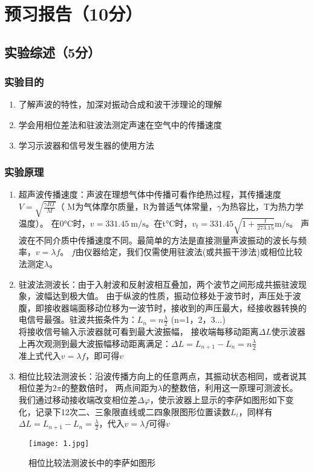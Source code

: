 \documentclass{../template/Report}
\begin{document}
\maketitle

\section{预习报告（10分）}
\subsection{实验综述（5分）}
\subsubsection{实验目的}
\begin{enumerate}
	\item 了解声波的特性，加深对振动合成和波干涉理论的理解
	\item 学会用相位差法和驻波法测定声速在空气中的传播速度
	\item 学习示波器和信号发生器的使用方法
\end{enumerate}
\subsubsection{实验原理}
\begin{enumerate}
	\item 超声波传播速度：声波在理想气体中传播可看作绝热过程，其传播速度$V=\sqrt{\frac{\gamma RT}{M}}$（
	      M为气体摩尔质量，R为普适气体常量，$\gamma$为热容比，T为热力学温度）。
	      在0$\si{\degreeCelsius}$时，$v=\SI{331.45}{\metre\per\second}$。在t$\si{\degreeCelsius}$时，$v_t = 331.45\sqrt{1+\frac{t}{273.15}}\si{\metre\per\second}$。
	      声波在不同介质中传播速度不同。最简单的方法是直接测量声波振动的波长与频率，$v=\lambda f$。
	      $f$由仪器给定，我们仅需使用驻波法(或共振干涉法)或相位比较法测定$\lambda$。
	\item 驻波法测波长：由于入射波和反射波相互叠加，两个波节之间形成共振驻波现象，波幅达到极大值。
	      由于纵波的性质，振动位移处于波节时，声压处于波腹，即接收器端面移动位移为一波节时，接收到的声压最大，经接收器转换的电信号最强。驻波共振条件为：$L_n = n\frac{\lambda}{2}$ (n=1，2，3...)\\
	      将接收信号输入示波器就可看到最大波振幅，
	      接收端每移动距离$\Delta L$使示波器上再次观测到最大波振幅移动距离满足：$\Delta L = L_{n+1} - L_n = n\frac{\lambda}{2}$\\
	      准上式代入$v=\lambda f$，即可得$v$
	\item 相位比较法测波长：沿波传播方向上的任意两点，其振动状态相同，或者说其相位差为$2\pi$的整数倍时，
	      两点间距为$\lambda$的整数倍，利用这一原理可测波长。
	      我们通过移动接收端改变相位差$\Delta\varphi$，使示波器上显示的李萨如图形如下变化，记录下12次二、三象限直线或二四象限图形位置读数$L_i$，同样有$\Delta L = L_{n+1} - L_n = \frac{\lambda}{2}$，代入$v=\lambda f$可得$v$
\end{enumerate}
\begin{figure}[H]
	\centering
	\texttt{[image: 1.jpg]}
	\caption{相位比较法测波长中的李萨如图形}
\end{figure}
\end{document}
